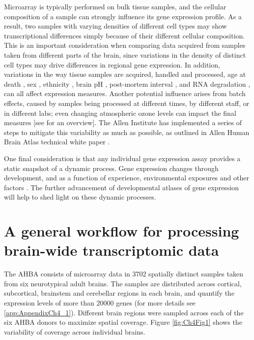 Microarray is typically performed on bulk tissue samples, and the cellular composition of a sample can strongly influence its gene expression profile. As a result, two samples with varying densities of different cell types may show transcriptional differences simply because of their different cellular composition. This is an important consideration when comparing data acquired from samples taken from different parts of the brain, since variations in the density of distinct cell types may drive differences in regional gene expression. In addition, variations in the way tissue samples are acquired, handled and processed, age at death \citep{Glass2013}, sex \citep{Berchtold2008,Trabzuni2013}, ethnicity \citep{Spielman2007}, brain pH \citep{Mexal2006}, post-mortem interval \citep{Zhu2017}, and RNA degradation \citep{Jaksik2015}, can all affect expression measures. Another potential influence arises from batch effects, caused by samples being processed at different times, by different staff, or in different labs; even changing atmospheric ozone levels can impact the final measures \citep{Fare2003} [see \citet{Scherer2009} for an overview]. The Allen Institute has implemented a series of steps to mitigate this variability as much as possible, as outlined in Allen Human Brain Atlas technical white paper \citep{AHBAdoc}.

One final consideration is that any individual gene expression assay provides a static snapshot of a dynamic process. Gene expression changes through development, and as a function of experience, environmental exposures and other factors \citep{Fraser2005,Choi2007,Berchtold2008,Cole2009,Birdsill2011,Naumova2012,Kumar2013}.
The further advancement of developmental atlases of gene expression \citep{Johnson2009,Colantuoni2011,Kang2011,Fertuzinhos2014,Bakken2016} will help to shed light on these dynamic processes.

\section{A general workflow for processing brain-wide transcriptomic data}
The AHBA consists of microarray data in \num{3702} spatially distinct samples taken from six neurotypical adult brains. The samples are distributed across cortical, subcortical, brainstem and cerebellar regions in each brain, and quantify the expression levels of more than \num{20000} genes (for more details see \ref{app:AppendixCh4_1}). Different brain regions were sampled across each of the six AHBA donors to maximize spatial coverage. Figure \ref{fig:Ch4Fig1} shows the  variability of coverage across individual brains.

